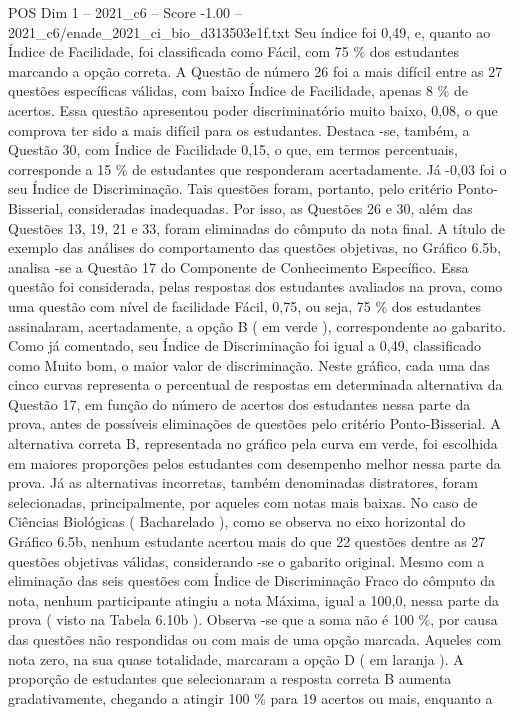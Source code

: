 \begin{textsample}{POS Dim 1 – 2021\_c6 – Score -1.00 – 2021\_c6/enade\_2021\_ci\_bio\_d313503e1f.txt}
Seu índice foi 0,49, e, quanto ao Índice de Facilidade, foi classificada como Fácil, com 75 \% dos estudantes marcando a opção correta.
A Questão de número 26 foi a mais difícil entre as 27 questões específicas válidas, com baixo Índice de Facilidade, apenas 8 \% de acertos.
Essa questão apresentou poder discriminatório muito baixo, 0,08, o que comprova ter sido a mais difícil para os estudantes.
Destaca -se, também, a Questão 30, com Índice de Facilidade 0,15, o que, em termos percentuais, corresponde a 15 \% de estudantes que responderam acertadamente.
Já -0,03 foi o seu Índice de Discriminação.
Tais questões foram, portanto, pelo critério Ponto-Bisserial, consideradas inadequadas.
Por isso, as Questões 26 e 30, além das Questões 13, 19, 21 e 33, foram eliminadas do cômputo da nota final.
A título de exemplo das análises do comportamento das questões objetivas, no Gráfico 6.5b, analisa -se a Questão 17 do Componente de Conhecimento Específico.
Essa questão foi considerada, pelas respostas dos estudantes avaliados na prova, como uma questão com nível de facilidade Fácil, 0,75, ou seja, 75 \% dos estudantes assinalaram, acertadamente, a opção B ( em verde ), correspondente ao gabarito.
Como já comentado, seu Índice de Discriminação foi igual a 0,49, classificado como Muito bom, o maior valor de discriminação.
Neste gráfico, cada uma das cinco curvas representa o percentual de respostas em determinada alternativa da Questão 17, em função do número de acertos dos estudantes nessa parte da prova, antes de possíveis eliminações de questões pelo critério Ponto-Bisserial.
A alternativa correta B, representada no gráfico pela curva em verde, foi escolhida em maiores proporções pelos estudantes com desempenho melhor nessa parte da prova.
Já as alternativas incorretas, também denominadas distratores, foram selecionadas, principalmente, por aqueles com notas mais baixas.
No caso de Ciências Biológicas ( Bacharelado ), como se observa no eixo horizontal do Gráfico 6.5b, nenhum estudante acertou mais do que 22 questões dentre as 27 questões objetivas válidas, considerando -se o gabarito original.
Mesmo com a eliminação das seis questões com Índice de Discriminação Fraco do cômputo da nota, nenhum participante atingiu a nota Máxima, igual a 100,0, nessa parte da prova ( visto na Tabela 6.10b ).
Observa -se que a soma não é 100 \%, por causa das questões não respondidas ou com mais de uma opção marcada.
Aqueles com nota zero, na sua quase totalidade, marcaram a opção D ( em laranja ).
A proporção de estudantes que selecionaram a resposta correta B aumenta gradativamente, chegando a atingir 100 \% para 19 acertos ou mais, enquanto a

\end{textsample}
